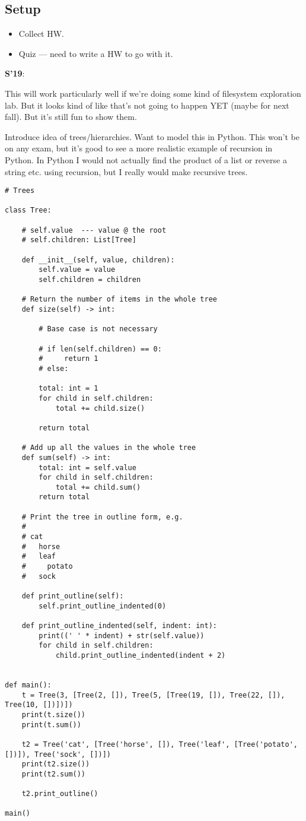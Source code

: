 \documentclass{article}
\newenvironment{reflect}[1]
{
  \noindent
  \begin{lrbox}{\reflectbox}
    \begin{minipage}[t]{\textwidth}
      \textbf{#1}:
}{
    \end{minipage}
  \end{lrbox}
  \fbox{\usebox{\reflectbox}}
}
\newcommand{\notready}{\textcolor{red}{\XSolidBold}\xspace}
\begin{document}
\subsection*{Setup}
\begin{itemize}
\item Collect HW.
\item \notready Quiz --- need to write a HW to go with it.
\end{itemize}

\begin{reflect}{S'19}
  This will work particularly well if we're doing some kind of
  filesystem exploration lab.  But it looks kind of like that's not
  going to happen YET (maybe for next fall).  But it's still fun to
  show them.
\end{reflect}

Introduce idea of trees/hierarchies.  Want to model this in Python.
This won't be on any exam, but it's good to see a more realistic
example of recursion in Python.  In Python I would not actually find
the product of a list or reverse a string etc. using recursion, but I
really would make recursive trees.

\begin{verbatim}
# Trees

class Tree:

    # self.value  --- value @ the root
    # self.children: List[Tree]

    def __init__(self, value, children):
        self.value = value
        self.children = children

    # Return the number of items in the whole tree
    def size(self) -> int:

        # Base case is not necessary

        # if len(self.children) == 0:
        #     return 1
        # else:

        total: int = 1
        for child in self.children:
            total += child.size()

        return total

    # Add up all the values in the whole tree
    def sum(self) -> int:
        total: int = self.value
        for child in self.children:
            total += child.sum()
        return total

    # Print the tree in outline form, e.g.
    #
    # cat
    #   horse
    #   leaf
    #     potato
    #   sock

    def print_outline(self):
        self.print_outline_indented(0)

    def print_outline_indented(self, indent: int):
        print((' ' * indent) + str(self.value))
        for child in self.children:
            child.print_outline_indented(indent + 2)


def main():
    t = Tree(3, [Tree(2, []), Tree(5, [Tree(19, []), Tree(22, []), Tree(10, [])])])
    print(t.size())
    print(t.sum())

    t2 = Tree('cat', [Tree('horse', []), Tree('leaf', [Tree('potato', [])]), Tree('sock', [])])
    print(t2.size())
    print(t2.sum())

    t2.print_outline()

main()
\end{verbatim}
\end{document}
